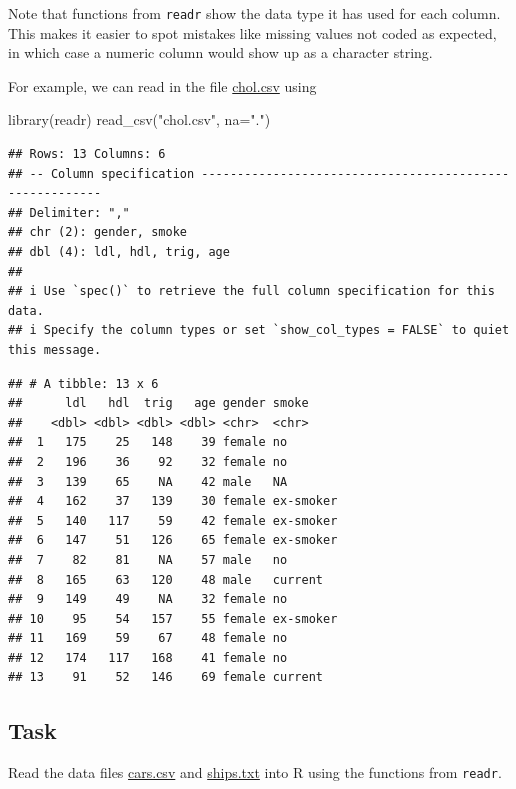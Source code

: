 \documentclass[
]{book}
\newenvironment{Shaded}{\begin{snugshade}}{\end{snugshade}}
\newcommand{\AttributeTok}[1]{\textcolor[rgb]{0.77,0.63,0.00}{#1}}
\newcommand{\FunctionTok}[1]{\textcolor[rgb]{0.00,0.00,0.00}{#1}}
\newcommand{\NormalTok}[1]{#1}
\newcommand{\StringTok}[1]{\textcolor[rgb]{0.31,0.60,0.02}{#1}}
\begin{document}
Note that functions from \texttt{readr} show the data type it has used for each column. This makes it easier to spot mistakes like missing values not coded as expected, in which case a numeric column would show up as a character string.

For example, we can read in the file \href{https://github.com/UofGAnalyticsData/R/raw/main/Week\%203/chol.csv}{chol.csv} using

\begin{Shaded}
\begin{Highlighting}[]
\FunctionTok{library}\NormalTok{(readr)}
\FunctionTok{read\_csv}\NormalTok{(}\StringTok{"chol.csv"}\NormalTok{, }\AttributeTok{na=}\StringTok{"."}\NormalTok{)}
\end{Highlighting}
\end{Shaded}

\begin{verbatim}
## Rows: 13 Columns: 6
## -- Column specification --------------------------------------------------------
## Delimiter: ","
## chr (2): gender, smoke
## dbl (4): ldl, hdl, trig, age
## 
## i Use `spec()` to retrieve the full column specification for this data.
## i Specify the column types or set `show_col_types = FALSE` to quiet this message.
\end{verbatim}

\begin{verbatim}
## # A tibble: 13 x 6
##      ldl   hdl  trig   age gender smoke    
##    <dbl> <dbl> <dbl> <dbl> <chr>  <chr>    
##  1   175    25   148    39 female no       
##  2   196    36    92    32 female no       
##  3   139    65    NA    42 male   NA       
##  4   162    37   139    30 female ex-smoker
##  5   140   117    59    42 female ex-smoker
##  6   147    51   126    65 female ex-smoker
##  7    82    81    NA    57 male   no       
##  8   165    63   120    48 male   current  
##  9   149    49    NA    32 female no       
## 10    95    54   157    55 female ex-smoker
## 11   169    59    67    48 female no       
## 12   174   117   168    41 female no       
## 13    91    52   146    69 female current
\end{verbatim}

\hypertarget{task-2}{%
\subsection{Task}\label{task-2}}

Read the data files \href{https://github.com/UofGAnalyticsData/R/raw/main/Week\%203/cars.csv}{cars.csv} and \href{https://github.com/UofGAnalyticsData/R/raw/main/Week\%203/ships.txt}{ships.txt} into R using the functions from \texttt{readr}.
\end{document}
